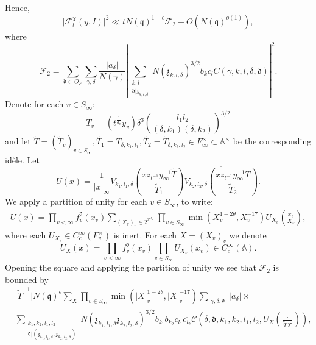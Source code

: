 \documentclass[a4paper,11pt]{amsart}
\theoremstyle{definition}
\newcommand{\A}{\mathbb{A}}
\newcommand{\Z}{\mathbb{Z}}
\begin{document}
Hence,
\begin{equation}\label{eq:10.3.1}\vert \mathcal{F}_t^\chi(y,I)\vert ^2 \ll tN(\mathfrak{q})^{1+\epsilon}\mathcal{F}_2 + O(N(\mathfrak{q})^{o(1)}),  \end{equation}
where
\begin{equation*}
    \mathcal{F}_2 = \sum_{\mathfrak{d}\subset O_F}\sum_{\gamma,\delta}\frac{\vert{a_{\delta}}\vert}{N(\gamma)}\left\vert{\sum_{\substack{k,l\\\mathfrak{d}|\mathfrak{z}_{k,l,\delta}}}N(\mathfrak{z}_{k,l,\delta})^{3/2}b_kc_lC(\gamma,k,l,\delta,\mathfrak{d})}\right\vert^2.
\end{equation*}
 Denote for each $v\in S_{\infty}$: \[\tilde{T}_v= (t^{\frac{1}{d_v}}y_v)\delta^3(\frac{l_1l_2}{(\delta,k_1)(\delta,k_2)})^{3/2} \] and let $\tilde{T} = (\tilde{T}_v)_{v\in S_{\infty}}, \tilde{T_1} = \tilde{T}_{\delta,k_1,l_1}, \tilde{T_2} = \tilde{T}_{\delta,k_2,l_2}\in F_{\infty}^{\times} \subset \A^{\times}$ be the corresponding idèle.
Let \[ U(x) = \frac{1}{\vert{x}\vert_{\infty}}V_{k_1,l_1,\delta}\left(\frac{x z_{t^{-1}}y_{\infty}^{-1}\tilde{T}}{\tilde{T}_1}\right)\overline{V_{k_2,l_2,\delta}\left(\frac{xz_{t^{-1}}y_{\infty}^{-1}\tilde{T}}{\tilde{T}_2}\right)}.
\]
We apply a partition of unity for each $v\in S_{\infty}$, to write:
\begin{align*}U(x)=\prod_{v<\infty}f_v^{\mathfrak{d}}(x_v)\sum_{(X_v)_v\in 2^{\Z^{d_{\infty}}}} \prod_{v\in S_{\infty}}\min(X_v^{1-2\theta},X_v^{-17})U_{X_v}\left(\frac{x_v}{X_v}\right),\end{align*}
where each $U_{X_v} \in C_c^{\infty}(F_v^{\times})$ is inert.
For each $X = (X_v)_v$ we denote \[U_X(x) = \prod_{v<\infty}f_v^{\mathfrak{d}}(x_v)\prod_{v\in S_{\infty}}U_{X_v}(x_v)\in C_c^{\infty}(\A).\]
Opening the square and applying the partition of unity we see that $\mathcal{F}_2$ is bounded by 
\begin{align}\label{eq:finalboundF} &\vert{\tilde{T}^{-1}}\vert N(\mathfrak{q})^{\epsilon}\sum_{X}\prod_{v\in S_{\infty}}\min(\vert{X}\vert_v^{1-2\theta},\vert{X}\vert_v^{-17})\sum_{\substack{\gamma,\delta,\mathfrak{d}}}\vert{a_{\delta}}\vert\times \nonumber\nonumber\\&\sum_{\substack{k_1,k_2,l_1,l_2\\\mathfrak{d}|(\mathfrak{z}_{k_1,l_1,\delta},\mathfrak{z}_{k_2,l_2,\delta})}}N(\mathfrak{z}_{k_1,l_1,\delta}\mathfrak{z}_{k_2,l_2,\delta})^{3/2}b_{k_1}\overline{b_{k_2}}c_{l_1}\overline{c_{l_2}}\mathscr{C}(\delta,\mathfrak{d},k_1,k_2,l_1,l_2,U_X(\frac{\cdot}{\tilde{T}X})),
\end{align}
\end{document}
